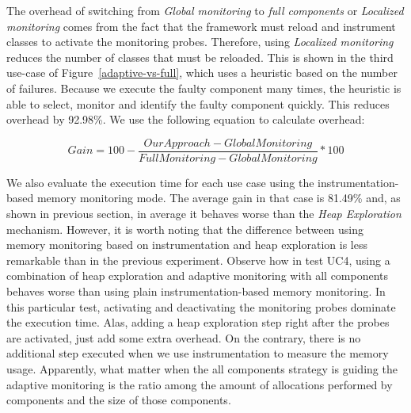 The overhead of switching from \emph{Global monitoring} to \emph{full components} or \emph{Localized monitoring} comes from the fact that the framework must reload and instrument classes to activate the monitoring probes.
Therefore, using \emph{Localized monitoring} reduces the number of classes that must be reloaded.
This is shown in the third use-case of Figure~\ref{adaptive-vs-full}, which uses a heuristic based on the number of failures.
Because we execute the faulty component many times, the heuristic is able to select, monitor and identify the faulty component quickly. This reduces overhead by 92.98\%. We use the following equation to calculate overhead:

\[ Gain=100-\frac{OurApproach-GlobalMonitoring}{FullMonitoring-GlobalMonitoring}*100 \]

We also evaluate the execution time for each use case using the instrumentation-based memory monitoring mode.
The average gain in that case is 81.49\% and, as shown in previous section, in average it behaves worse than the \textit{Heap Exploration} mechanism.
However, it is worth noting that the difference between using memory monitoring based on instrumentation and heap exploration is less remarkable than in the previous experiment.
Observe how in test UC4, using a combination of heap exploration and adaptive monitoring with all components behaves worse than using plain instrumentation-based memory monitoring.
In this particular test, activating and deactivating the monitoring probes dominate the execution time.
Alas, adding a heap exploration step right after the probes are activated, just add some extra overhead.
On the contrary, there is no additional step executed when we use instrumentation to measure the memory usage.
Apparently, what matter when the all components strategy is guiding the adaptive monitoring is the ratio among the amount of allocations performed by components and the size of those components.

